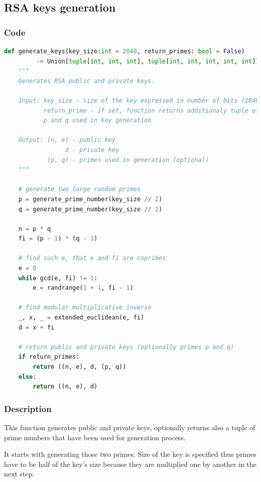 \documentclass{article}
\begin{document}
\subsection{RSA keys generation}
\subsubsection{Code}

\small

\begin{lstlisting}[language=Python]
    def generate_keys(key_size:int = 2048, return_primes: bool = False)
         -> Union[tuple[int, int, int], tuple[int, int, int, int, int]]:
    """
    Generates RSA public and private keys.

    Input: key_size - size of the key expressed in number of bits (2048 bits by default)
           return_prime - if set, function returns additionaly tuple of prime numbers 
           p and q used in key generation

    Output: (n, e) - public key
                 d - private key
            (p, q) - primes used in generation (optional)
    """

    # generate two large random primes
    p = generate_prime_number(key_size // 2)
    q = generate_prime_number(key_size // 2)

    n = p * q
    fi = (p - 1) * (q - 1)

    # find such e, that e and fi are coprimes
    e = 0
    while gcd(e, fi) != 1:
        e = randrange(1 + 1, fi - 1)

    # find modular multiplicative inverse
    _, x, _ = extended_euclidean(e, fi)
    d = x + fi

    # return public and private keys (optionally primes p and q)
    if return_primes:
        return ((n, e), d, (p, q))
    else:
        return ((n, e), d)
\end{lstlisting}

\normalsize

\subsubsection{Description}
This function generates public and private keys, optionally returns also a tuple of prime
numbers that have been used for generation process.

It starts with generating those two primes. Size of the key is specified thus primes have
to be half of the key's size because they are multiplied one by another in the next step.
\end{document}
